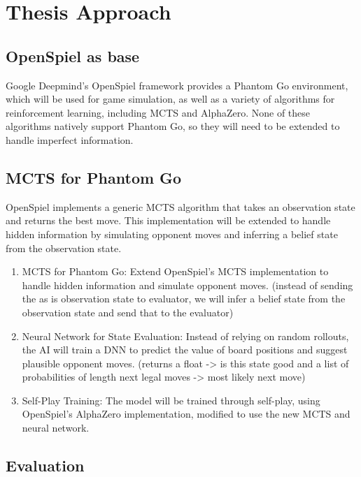 \documentclass[12pt,oneside,openright]{article}
\begin{document}
\section{Thesis Approach}


\subsection{OpenSpiel as base}

Google Deepmind's OpenSpiel framework provides a Phantom Go environment, which will be used for game simulation, as well as a variety of algorithms for reinforcement learning, including MCTS and AlphaZero. None of these algorithms natively support Phantom Go, so they will need to be extended to handle imperfect information.

\subsection{MCTS for Phantom Go}

OpenSpiel implements a generic MCTS algorithm that takes an observation state and returns the best move. This implementation will be extended to handle hidden information by simulating opponent moves and inferring a belief state from the observation state.

\begin{enumerate}
  \item MCTS for Phantom Go: Extend OpenSpiel's MCTS implementation to handle hidden information and simulate opponent moves.
        (instead of sending the as is observation state to evaluator, we will infer a belief state from the observation state and send that to the evaluator)
  \item Neural Network for State Evaluation: Instead of relying on random rollouts, the AI will train a DNN to predict the value of board positions and suggest plausible opponent moves. (returns a float -> is this state good and a list of probabilities of length next legal moves -> most likely next move)
  \item Self-Play Training: The model will be trained through self-play, using OpenSpiel's AlphaZero implementation, modified to use the new MCTS and neural network.
\end{enumerate}


\subsection{Evaluation}
\end{document}

